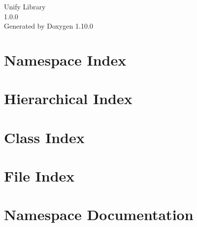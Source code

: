 \documentclass[twoside]{book}
\newcommand{\+}{\discretionary{\mbox{\scriptsize$\hookleftarrow$}}{}{}}
\newcommand{\clearemptydoublepage}{%
    \newpage{\pagestyle{empty}\cleardoublepage}%
  }
\begin{document}
  \raggedbottom
    \hypersetup{pageanchor=false,
                bookmarksnumbered=true,
                pdfencoding=unicode
               }
  \begin{titlepage}
  \vspace*{7cm}
  \begin{center}%
  {\Large Unify Library}\\
  [1ex]\large 1.\+0.\+0 \\
  \vspace*{1cm}
  {\large Generated by Doxygen 1.10.0}\\
  \end{center}
  \end{titlepage}
  \clearemptydoublepage
  \tableofcontents
  \clearemptydoublepage
  \hypersetup{pageanchor=true}

\chapter{Namespace Index}

\chapter{Hierarchical Index}

\chapter{Class Index}

\chapter{File Index}

\chapter{Namespace Documentation}



\end{document}
